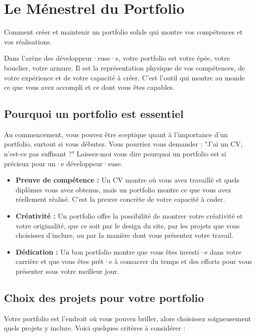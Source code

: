 \chapter{Le Ménestrel du Portfolio}

Comment créer et maintenir un portfolio solide qui montre vos compétences et vos réalisations.

Dans l'arène des développeur·euse·s, votre portfolio est votre épée, votre bouclier, votre armure. Il est la représentation physique de vos compétences, de votre expérience et de votre capacité à créer. C'est l'outil qui montre au monde ce que vous avez accompli et ce dont vous êtes capables.

\section{Pourquoi un portfolio est essentiel}

Au commencement, vous pouvez être sceptique quant à l'importance d'un portfolio, surtout si vous débutez. Vous pourriez vous demander : "J'ai un CV, n'est-ce pas suffisant ?" Laissez-moi vous dire pourquoi un portfolio est si précieux pour un·e développeur·euse.

\begin{itemize}
  \item \textbf{Preuve de compétence :} Un CV montre où vous avez travaillé et quels diplômes vous avez obtenus, mais un portfolio montre ce que vous avez réellement réalisé. C'est la preuve concrète de votre capacité à coder.
  \item \textbf{Créativité :} Un portfolio offre la possibilité de montrer votre créativité et votre originalité, que ce soit par le design du site, par les projets que vous choisissez d'inclure, ou par la manière dont vous présentez votre travail.
  \item \textbf{Dédication :} Un bon portfolio montre que vous êtes investi·e dans votre carrière et que vous êtes prêt·e à consacrer du temps et des efforts pour vous présenter sous votre meilleur jour.
\end{itemize}

\section{Choix des projets pour votre portfolio}

Votre portfolio est l'endroit où vous pouvez briller, alors choisissez soigneusement quels projets y inclure. Voici quelques critères à considérer :

